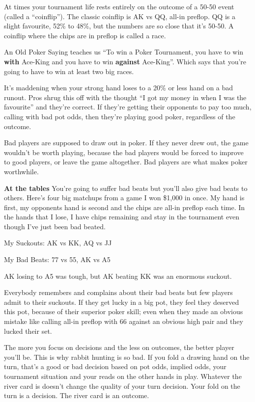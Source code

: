 At times your tournament life rests entirely on the outcome of
a 50-50 event (called a ``coinflip'').
The classic coinflip is AK vs QQ, all-in preflop. QQ is a slight
favourite, 52\% to 48\%, but the numbers are so close that it's 50-50.
A coinflip where the chips are in preflop is called a race.

An Old Poker Saying teaches us ``To win a
Poker Tournament, you have to win \textbf{with} Ace-King and
you have to win \textbf{against} Ace-King''. Which says that you're
going to have to win at least two big races.

It's maddening when your strong hand loses to a 20\% or less
hand on a bad runout. Pros shrug this off with
the thought ``I got my money in when I was the favourite'' and they're
correct. If they're getting their opponents to pay too much, calling
with bad pot odds, then they're playing good poker, regardless of
the outcome.

Bad players are supposed to draw out in poker. If they never drew
out, the game wouldn't be worth playing, because the bad players
would be forced to improve to good players, or leave the game
altogether. Bad players are what makes poker worthwhile.

\textbf{At the tables} You're going to suffer bad beats but you'll
also give bad beats to others. Here's four big matchups from a game
I won \$1,000 in once. My hand is first, my opponents hand is second
and the chips are all-in preflop each time. In the hands that I
lose, I have chips remaining and stay in the tournament even
though I've just been bad beated.

My Suckouts: AK vs KK, AQ vs JJ

My Bad Beats: 77 vs 55, AK vs A5

AK losing to A5 was tough, but AK beating KK was an enormous suckout.

Everybody remembers and complains about their bad beats but few
players admit to their suckouts. If they get lucky in a big pot, they
feel they deserved this pot, because of their superior poker skill;
even when they made an obvious mistake like calling all-in preflop
with 66 against an obvious high pair and they lucked their set.


The more you focus on decisions and the less on outcomes, the
better player you'll be. This is why rabbit hunting is so bad. If
you fold a drawing hand on the turn, that's a good or bad decision
based on pot odds, implied odds, your tournament situation
and your reads on the other hands in play. Whatever the river card is
doesn't change the quality of your turn decision. Your fold on the
turn is a decision. The river card is an outcome.

